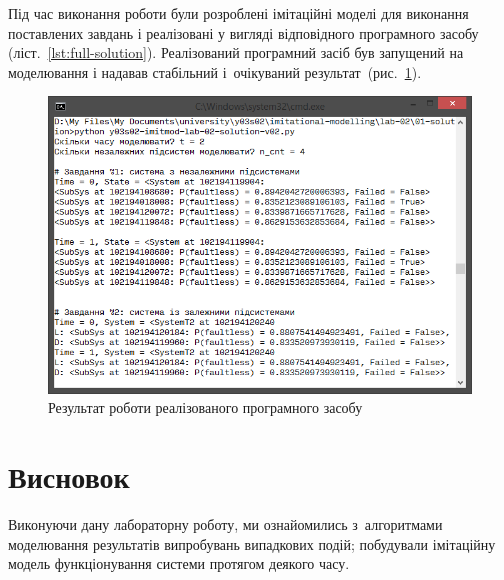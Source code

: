 \documentclass[
	a4paper,
	oneside,
	BCOR = 10mm,
	DIV = 12,
	12pt,
	headings = normal,
]{scrartcl}
\begin{document}
		Під час виконання роботи були розроблені імітаційні моделі для виконання поставлених завдань і реалізовані у вигляді відповідного програмного засобу (ліст.~\ref{lst:full-solution}). Реалізований програмний засіб був запущений на моделювання і надавав стабільний і~очікуваний результат~(рис.~\ref{fig:res}).

		\begin{figure}[!htbp]
			\centering
			\includegraphics[height = 10\baselineskip]{./assets/y03s02-imitmod-lab-02-p00.png}
			\caption{Результат роботи реалізованого програмного засобу}
			\label{fig:res}
		\end{figure}

		\section{Висновок}
			Виконуючи дану лабораторну роботу, ми ознайомились з~алгоритмами моделювання результатів випробувань випадкових подій; побудували імітаційну модель функціонування системи протягом деякого часу.

		\appendix
\end{document}
